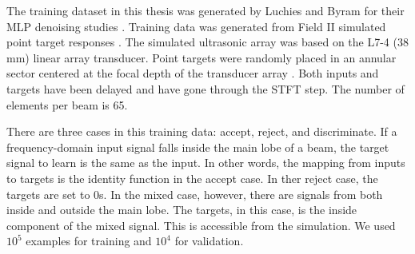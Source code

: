 The training dataset in this thesis was generated by Luchies and Byram for their MLP denoising studies \cite{luchies_tmi_2018}. Training data was generated from Field II simulated point target responses \cite{jensen1992calculation, jensen1996field}. The simulated ultrasonic array was based on the L7-4 (38 mm) linear array transducer. Point targets were randomly placed in an annular sector centered at the focal depth of the transducer array \cite{training_improvements}. Both inputs and targets have been delayed and have gone through the STFT step. The number of elements per beam is 65.

There are three cases in this training data: accept, reject, and discriminate. If a frequency-domain input signal falls inside the main lobe of a beam, the target signal to learn is the same as the input. In other words, the mapping from inputs to targets is the identity function in the accept case. In ther reject case, the targets are set to 0s. In the mixed case, however, there are signals from both inside and outside the main lobe. The targets, in this case, is the inside component of the mixed signal. This is accessible from the simulation. We used $10^5$ examples for training and $10^4$ for validation.











